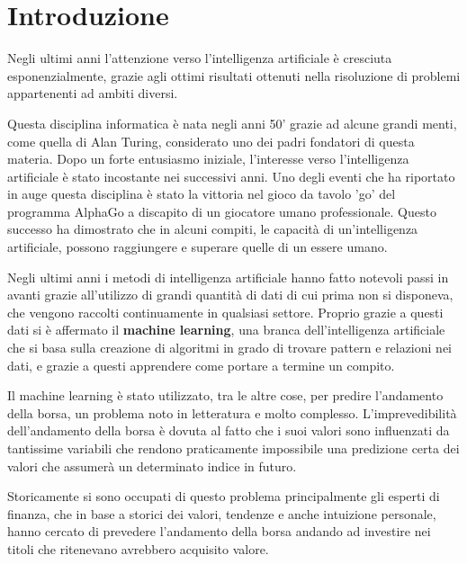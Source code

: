 \documentclass[12pt,a4paper,twoside,openright]{book}
\begin{document}
\frontmatter 

\maketitle

\chapter*{Introduzione}
Negli ultimi anni l'attenzione verso l'intelligenza artificiale è cresciuta esponenzialmente, grazie agli ottimi risultati ottenuti nella risoluzione di problemi appartenenti ad ambiti diversi. 

Questa disciplina informatica è nata negli anni 50' grazie ad alcune grandi menti, come quella di Alan Turing, considerato uno dei padri fondatori di questa materia.
Dopo un forte entusiasmo iniziale, l'interesse verso l'intelligenza artificiale è stato incostante nei successivi anni. Uno degli eventi che ha riportato in auge questa disciplina è stato la vittoria nel gioco da tavolo 'go' del programma AlphaGo a discapito di un giocatore umano professionale. Questo successo ha dimostrato che in alcuni compiti, le capacità di un'intelligenza artificiale, possono raggiungere e superare quelle di un essere umano. 

Negli ultimi anni i metodi di intelligenza artificiale hanno fatto notevoli passi in avanti grazie all'utilizzo di grandi quantità di dati di cui prima non si disponeva, che vengono raccolti continuamente in qualsiasi settore.
Proprio grazie a questi dati si è affermato il \textbf{machine learning}, una branca dell'intelligenza artificiale che si basa sulla creazione di algoritmi in grado di trovare pattern e relazioni nei dati, e grazie a questi apprendere come portare a termine un compito.

Il machine learning è stato utilizzato, tra le altre cose, per predire l'andamento della borsa, un problema noto in letteratura e molto complesso. L’imprevedibilità dell’andamento della borsa è dovuta al fatto che i suoi valori sono influenzati da tantissime variabili che rendono praticamente impossibile una predizione certa dei valori che assumerà un determinato indice in futuro.

Storicamente si sono occupati di questo problema principalmente gli esperti di finanza, che in base a storici dei valori, tendenze e anche intuizione personale, hanno cercato di prevedere l’andamento della borsa andando ad investire nei titoli che ritenevano avrebbero acquisito valore.
\end{document}
